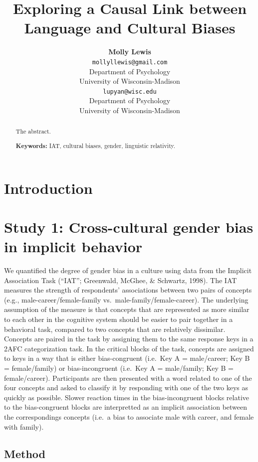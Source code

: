 \documentclass[10pt, letterpaper]{article}
\title{Exploring a Causal Link between Language and Cultural Biases}
\author{{\large \bf Molly Lewis} \\ \texttt{mollyllewis@gmail.com} \\ Department of Psychology  \\ University of Wisconsin-Madison \And {\large \bf Gary Lupyan} \\ \texttt{lupyan@wisc.edu} \\ Department of Psychology  \\ University of Wisconsin-Madison}
\begin{document}
\maketitle

\begin{abstract}
The abstract.

\textbf{Keywords:}
IAT, cultural biases, gender, linguistic relativity.
\end{abstract}

\section{Introduction}\label{introduction}

\section{Study 1: Cross-cultural gender bias in implicit
behavior}\label{study-1-cross-cultural-gender-bias-in-implicit-behavior}

We quantified the degree of gender bias in a culture using data from the
Implicit Association Task (``IAT''; Greenwald, McGhee, \& Schwartz,
1998). The IAT measures the strength of respondents' associations
between two pairs of concepts (e.g., male-career/female-family
vs.~male-family/female-career). The underlying assumption of the measure
is that concepts that are represented as more similar to each other in
the cognitive system should be easier to pair together in a behavioral
task, compared to two concepts that are relatively dissimilar. Concepts
are paired in the task by assigning them to the same response keys in a
2AFC categorization task. In the critical blocks of the task, concepts
are assigned to keys in a way that is either bias-congruent (i.e.~Key A
= male/career; Key B = female/family) or bias-incongruent (i.e.~Key A =
male/family; Key B = female/career). Participants are then presented
with a word related to one of the four concepts and asked to classify it
by responding with one of the two keys as quickly as possible. Slower
reaction times in the bias-incongruent blocks relative to the
bias-congruent blocks are interpretted as an implicit association
between the correspondings concepts (i.e.~a bias to associate male with
career, and female with family).

\subsection{Method}\label{method}
\end{document}

